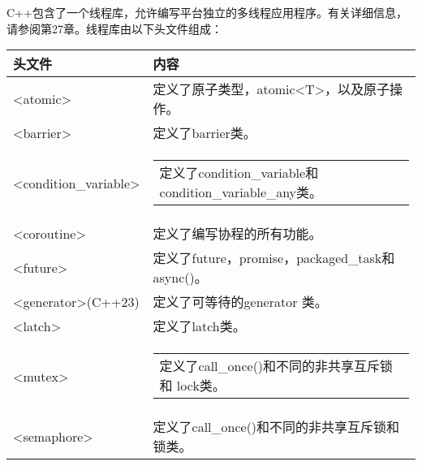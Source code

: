 C++包含了一个线程库，允许编写平台独立的多线程应用程序。有关详细信息，请参阅第27章。线程库由以下头文件组成：

\begin{longtable}{|l|l|}
\hline
\textbf{头文件}                              & \textbf{内容}                                                                                                     \\ \hline
\endfirsthead
%
\endhead
%
\textless{}atomic\textgreater{}              & 定义了原子类型，atomic<T>，以及原子操作。                                    \\ \hline
\textless{}barrier\textgreater{}             & 定义了barrier类。                                                                                            \\ \hline
\textless{}condition\_variable\textgreater{} & \begin{tabular}[c]{@{}l@{}}定义了condition\_variable和condition\_variable\_any类。\end{tabular}      \\ \hline
\textless{}coroutine\textgreater{}           & 定义了编写协程的所有功能。                                                                     \\ \hline
\textless{}future\textgreater{}              & 定义了future，promise，packaged\_task和async()。                                                                \\ \hline
\textless{}generator\textgreater (C++23)     & 定义了可等待的generator 类。                                                                                \\ \hline
\textless{}latch\textgreater{}               & 定义了latch类。                                                                                              \\ \hline
\textless{}mutex\textgreater{}               & \begin{tabular}[c]{@{}l@{}}定义了call\_once()和不同的非共享互斥锁和 lock类。\end{tabular}   \\ \hline
\textless{}semaphore\textgreater{}           & 定义了call\_once()和不同的非共享互斥锁和锁类。                                                        \\ \hline

\end{longtable}
